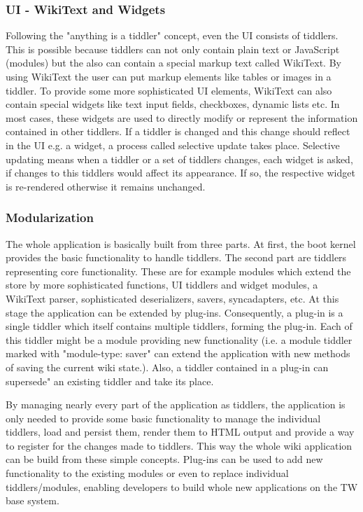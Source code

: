 \documentclass[12pt,a4paper]{scrartcl}
\newcommand{\todo}[1]{{\bf TODO: #1}\\
}
\begin{document}
\subsubsection*{UI - WikiText and Widgets}
Following the "anything is a tiddler" concept, even the UI consists of tiddlers.
This is possible because tiddlers can not only contain plain text or JavaScript (modules) but the also can contain a special markup text called WikiText.
By using WikiText the user can put markup elements like tables or images in a tiddler.
To provide some more sophisticated UI elements, WikiText can also contain special widgets like text input fields,
checkboxes, dynamic lists etc.
In most cases, these widgets are used to directly modify or represent the information contained in other tiddlers.
If a tiddler is changed and this change should reflect in the UI e.g. a widget, a process called selective update takes place. Selective updating means when a tiddler or a set of tiddlers changes, each widget is asked, if changes to this tiddlers would affect its appearance. If so, the respective widget is re-rendered otherwise it remains unchanged.

\subsubsection*{Modularization}
The whole application is basically built from three parts. At first, the boot kernel provides the basic functionality to handle tiddlers. The second part are tiddlers representing core functionality. These are for example modules which extend the store by more sophisticated functions, UI tiddlers and widget modules, a WikiText parser, sophisticated deserializers, savers, syncadapters, etc.
At this stage the application can be extended by plug-ins. Consequently, a plug-in is a single tiddler which itself contains multiple tiddlers, forming the plug-in. Each of this tiddler might be a module providing new functionality (i.e. a module tiddler marked with "module-type: saver" can extend the application with new methods of saving the current wiki state.).
Also, a tiddler contained in a plug-in can supersede" an existing tiddler and take its place.

By managing nearly every part of the application as tiddlers, the application is only needed to provide some basic functionality to manage the individual tiddlers, load and persist them, render them to HTML output and provide a way to register for the changes made to tiddlers.
This way the whole wiki application can be build from these simple concepts.
Plug-ins can be used to add new functionality to the existing modules or even to replace individual tiddlers/modules,
enabling developers to build whole new applications on the TW base system.
\end{document}
